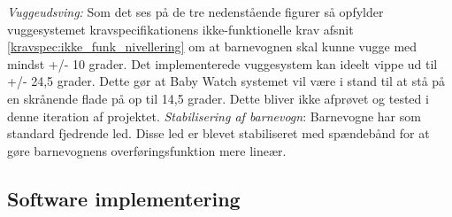 \textit{Vuggeudsving:}
Som det ses på de tre nedenstående figurer så opfylder vuggesystemet kravspecifikationens ikke-funktionelle krav afsnit \ref{kravspec:ikke_funk_nivellering} om at barnevognen skal kunne vugge med mindst +/- 10 grader. Det implementerede vuggesystem  kan ideelt vippe ud til +/- 24,5 grader. Dette gør at Baby Watch systemet vil være i stand til at stå på en skrånende flade på op til 14,5 grader. Dette bliver ikke afprøvet og tested i denne iteration af projektet. 
\textit{Stabilisering af barnevogn}:
Barnevogne har som standard fjedrende led. Disse led er blevet stabiliseret med spændebånd for at gøre barnevognens overføringsfunktion mere lineær. 

\newpage
\subsection{Software implementering}
